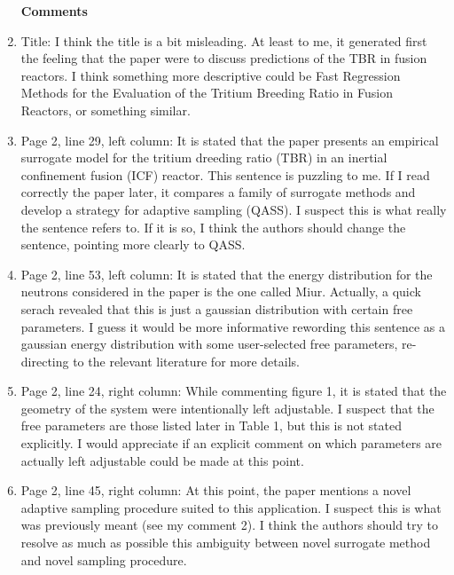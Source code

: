 \documentclass[12pt]{article}
\begin{document}
\begin{enumerate}
{\bf }

\newpage
\bigskip
\noindent
{\bf Comments}

\item Title:
I think the title is a bit misleading. At least to me, it generated first the feeling that the paper were to discuss predictions of the TBR in fusion reactors. I think something more descriptive could be Fast Regression Methods for the Evaluation of the Tritium Breeding Ratio in Fusion Reactors, or something similar.

{\bf }

\item Page 2, line 29, left column:
It is stated that the paper presents an empirical surrogate model for the tritium dreeding ratio (TBR) in an inertial confinement fusion (ICF) reactor. This sentence is puzzling to me. If I read correctly the paper later, it compares a family of surrogate methods and develop a strategy for adaptive sampling (QASS). I suspect this is what really the sentence refers to. If it is so, I think the authors should change the sentence, pointing more clearly to QASS.

{\bf }

\item Page 2, line 53, left column:
It is stated that the energy distribution for the neutrons considered in the paper is the one called Miur. Actually, a quick serach revealed that this is just a gaussian distribution with certain free parameters. I guess it would be more informative rewording this sentence as a gaussian energy distribution with some user-selected free parameters, re-directing to the relevant literature for more details.

{\bf }

\item  Page 2, line 24, right column:
While commenting figure 1, it is stated that the geometry of the system were intentionally left adjustable. I suspect that the free parameters are those listed later in Table 1, but this is not stated explicitly. I would appreciate if an explicit comment on which parameters are actually left adjustable could be made at this point.

{\bf }

\item Page 2, line 45, right column:
At this point, the paper mentions a novel adaptive sampling procedure suited to this application. I suspect this is what was previously meant (see my comment 2). I think the authors should try to resolve as much as possible this ambiguity between novel surrogate method and novel sampling procedure.


\end{enumerate}
\end{document}
